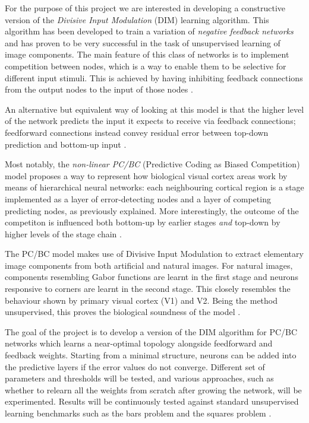 \documentclass[a4paper,12pt]{article}
\begin{document}
	For the purpose of this project we are interested in developing a constructive version of the \emph{Divisive Input Modulation} (DIM) learning algorithm.
	This algorithm has been developed to train a variation of \emph{negative feedback networks} and has proven to be very successful in the
	task of unsupervised learning of image components.
	The main feature of this class of networks is to implement competition between nodes, which is a way to enable them to be selective for different input stimuli.
	This is achieved by having inhibiting feedback connections from the output nodes to the input of those nodes \cite{spratling2009unsupervised}.
	
	An alternative but equivalent way of looking at this model is that the higher level of the network predicts the input it expects to receive via feedback connections;
	feedforward connections instead convey residual error between top-down prediction and bottom-up input \cite{spratling2008predictive}.
	
	Most notably, the \emph{non-linear PC/BC} (Predictive Coding as Biased Competition) model proposes a way to represent how biological visual cortex areas work
	by means of hierarchical neural networks: each neighbouring cortical region is a stage implemented as a layer of error-detecting nodes and a layer of competing predicting nodes, as previously explained.
	More interestingly, the outcome of the competiton is influenced both bottom-up by earlier stages \emph{and} top-down by higher levels of the stage chain \cite{spratling2008predictive}.
	
	The PC/BC model makes use of Divisive Input Modulation to extract elementary image components from both artificial and natural images.
	For natural images, components resembling Gabor functions are learnt in the first stage and neurons responsive to corners are learnt in the second stage.
	This closely resembles the behaviour shown by primary visual cortex (V1) and V2. Being the method unsupervised, this proves the biological soundness of the model \cite{spratling2012unsupervised}.
	
	The goal of the project is to develop a version of the DIM algorithm for PC/BC networks which learns a near-optimal topology alongside feedforward and feedback weights.
	Starting from a minimal structure, neurons can be added into the predictive layers if the error values do not converge. Different set of parameters and thresholds
	will be tested, and various approaches, such as whether to relearn all the weights from scratch after growing the network, will be experimented.
	Results will be continuously tested against standard unsupervised learning benchmarks such as the bars problem \cite{spratling2009unsupervised} and the squares problem \cite{spratling2012unsupervised}.
	
\end{document}
